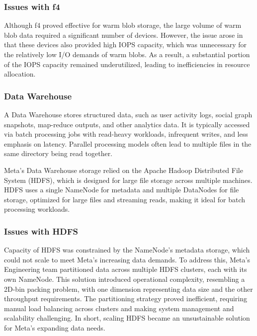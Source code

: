 \subsubsection*{Issues with f4}\label{sec:f4_issues}
Although f4 proved effective for warm blob storage, the large volume of warm blob data required a significant number of devices. However, the issue arose in that these devices also provided high IOPS capacity, which was unnecessary for the relatively low I/O demands of warm blobs. As a result, a substantial portion of the IOPS capacity remained underutilized, leading to inefficiencies in resource allocation.


\subsubsection{Data Warehouse}\label{sec:data_warehouse}
A Data Warehouse stores structured data, such as user activity logs, social graph snapshots, map-reduce outputs, and other analytics data. It is typically accessed via batch processing jobs with read-heavy workloads, infrequent writes, and less emphasis on latency. Parallel processing models often lead to multiple files in the same directory being read together.

Meta's Data Warehouse storage relied on the Apache Hadoop Distributed File System (HDFS)\cite{hdfs}, which is designed for large file storage across multiple machines. HDFS uses a single NameNode for metadata and multiple DataNodes for file storage, optimized for large files and streaming reads, making it ideal for batch processing workloads.


\subsubsection*{Issues with HDFS}\label{sec:hdfs_issues}
 Capacity of HDFS was constrained by the NameNode's metadata storage, which could not scale to meet Meta's increasing data demands. To address this, Meta's Engineering team partitioned data across multiple HDFS clusters, each with its own NameNode. This solution introduced operational complexity, resembling a 2D-bin packing problem, with one dimension representing data size and the other throughput requirements. The partitioning strategy proved inefficient, requiring manual load balancing across clusters and making system management and scalability challenging. In short, scaling HDFS became an unsustainable solution for Meta's expanding data needs.


